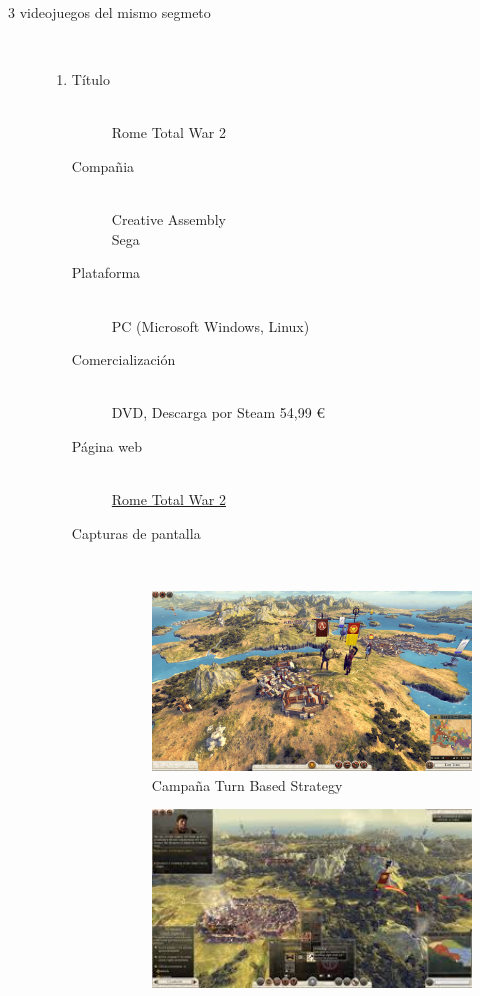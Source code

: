\documentclass[a4paper]{article}
\begin{document}
\begin{description}
  \item[3 videojuegos del mismo segmeto] \hfill \\
    \begin{enumerate}
      \item
      \begin{description}
        \item[Título] \hfill \\
        Rome Total War 2
        \item[Compañia] \hfill \\
        Creative Assembly \\Sega
        \item[Plataforma] \hfill \\
        PC (Microsoft Windows, Linux)
        \item[Comercialización] \hfill \\
        DVD, Descarga por Steam 54,99 \euro{}
        \item[Página web] \hfill \\
        \hyperlink{http://www.totalwar.com/en_us/rome2/}{Rome Total War 2}
        \item[Capturas de pantalla] \hfill \\
        \begin{figure}[ht!]
        \centering
        \includegraphics[width=90mm]{./Total-War-Rome-2-11.jpg}
        \caption{Campaña Turn Based Strategy}
        \label{overflow}
        \end{figure}
        \begin{figure}[ht!]
        \centering
        \includegraphics[width=90mm]{./images.jpeg}

\end{figure}
\end{description}
\end{enumerate}
\end{description}
\end{document}

